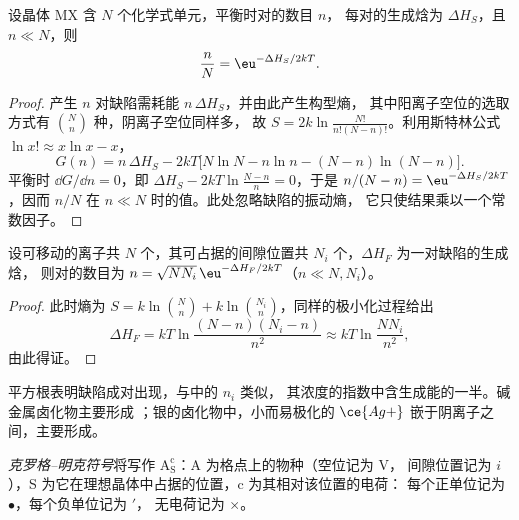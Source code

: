 \begin{theorem}[肖特基缺陷的平衡浓度]\label{thm:b3:solid-state:schottky}
设晶体 MX 含 $N$ 个化学式单元，平衡时对的数目 $n$，
每对的生成焓为 $\Delta H_S$，且 $n \ll N$，则
\[
  \frac{n}{N} = \eu^{-\Delta H_S/2kT}.
\]
\end{theorem}

\begin{proof}
产生 $n$ 对缺陷需耗能 $n\,\Delta H_S$，并由此产生构型熵，
其中阳离子空位的选取方式有 $\binom{N}{n}$ 种，阴离子空位同样多，
故 $S = 2k\ln\frac{N!}{n!(N - n)!}$。利用斯特林公式 $\ln x! \approx x\ln x - x$，
\[
  G(n) = n\,\Delta H_S - 2kT\bigl[N\ln N - n\ln n - (N - n)\ln(N - n)\bigr].
\]
平衡时 $\dd G/\dd n = 0$，即 $\Delta H_S - 2kT\ln\frac{N - n}{n} = 0$，于是 $n/(N - n) = \eu^{-\Delta H_S/2kT}$，因而 $n/N$ 在
$n \ll N$ 时的值。此处忽略缺陷的振动熵，
它只使结果乘以一个常数因子。
\end{proof}

\begin{proposition}[弗仑克尔缺陷]\label{prop:b3:solid-state:frenkel}
设可移动的离子共 $N$ 个，其可占据的间隙位置共 $N_i$ 个，$\Delta H_F$ 为一对缺陷的生成焓，
则对的数目为 $n =
\sqrt{NN_i}\,\eu^{-\Delta H_F/2kT}$（$n \ll N, N_i$）。
\end{proposition}

\begin{proof}
此时熵为 $S = k\ln\binom{N}{n} + k\ln\binom{N_i}{n}$，同样的极小化过程给出
\[
  \Delta H_F = kT\ln\frac{(N - n)(N_i - n)}{n^2} \approx kT\ln\frac{NN_i}{n^2},
\]
由此得证。
\end{proof}

平方根表明缺陷成对出现，与中的 $n_i$ 类似，
其浓度的指数中含生成能的一半。碱金属卤化物主要形成
；银的卤化物中，小而易极化的
$\ce{Ag+}$ 嵌于阴离子之间，主要形成。

\begin{definition}\label{def:b3:solid-state:kroger-vink}
\emph{克罗格–明克符号}将写作
$\mathrm{A_S^c}$：A 为格点上的物种（空位记为 V，
间隙位置记为 $i$），S 为它在理想晶体中占据的位置，c 为其相对该位置的电荷：
每个正单位记为 $\bullet$，每个负单位记为 $'$，
无电荷记为 $\times$。
\end{definition}

